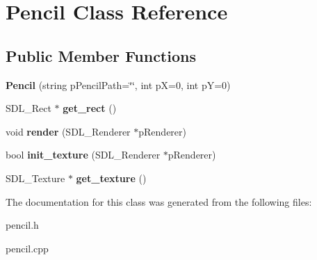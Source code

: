 \hypertarget{classPencil}{}\section{Pencil Class Reference}
\label{classPencil}
\subsection*{Public Member Functions}
\begin{DoxyCompactItemize}
\item 
\mbox{\label{classPencil_af6dfc29a867669f00d3696c7e3db2f46}} 
{\bfseries Pencil} (string p\+Pencil\+Path=\char`\"{}\char`\"{}, int pX=0, int pY=0)
\item 
\mbox{\label{classPencil_a8517f9bf932818d20f8aab9ef62410fa}} 
S\+D\+L\+\_\+\+Rect $\ast$ {\bfseries get\+\_\+rect} ()
\item 
\mbox{\label{classPencil_a8e7a7686265c9422ddf75ec147378949}} 
void {\bfseries render} (S\+D\+L\+\_\+\+Renderer $\ast$p\+Renderer)
\item 
\mbox{\label{classPencil_a11cb0a1d493bb61885100f6a9198ea00}} 
bool {\bfseries init\+\_\+texture} (S\+D\+L\+\_\+\+Renderer $\ast$p\+Renderer)
\item 
\mbox{\label{classPencil_aae1bc5312b274b09224a6259ef6ee459}} 
S\+D\+L\+\_\+\+Texture $\ast$ {\bfseries get\+\_\+texture} ()
\end{DoxyCompactItemize}


The documentation for this class was generated from the following files\+:\begin{DoxyCompactItemize}
\item 
pencil.\+h\item 
pencil.\+cpp\end{DoxyCompactItemize}
